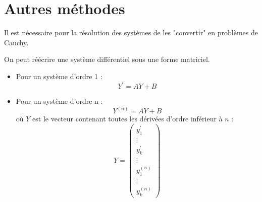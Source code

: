 \section{Autres méthodes}
















Il est nécessaire pour la résolution des systèmes de les "convertir" en problèmes de Cauchy.
\begin{prop}
On peut réécrire une système différentiel sous une forme matriciel.
\begin{itemize}
    \item Pour un système d'ordre  1 : $$Y^{\prime}=AY+B$$
    \item Pour un système d'ordre n :$$Y^{(n)}=AY+B$$
    où $Y$ est le vecteur contenant toutes les dérivées d'ordre inférieur à $n$ :
    $$Y=\begin{pmatrix}y_1^{\prime}\\\vdots\\y_k^{\prime}\\\vdots\\y_1^{(n)}\\\vdots\\y_k^{(n)}\end{pmatrix}$$
\end{itemize}
\end{prop}
